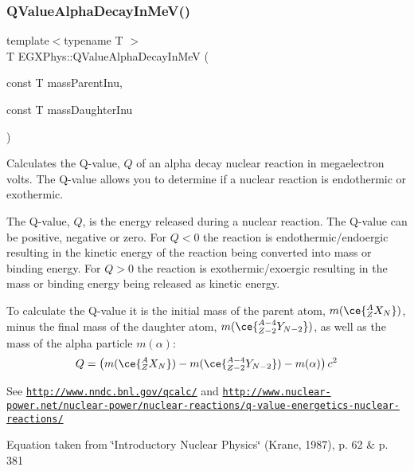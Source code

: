 \subsubsection{\texorpdfstring{Q\+Value\+Alpha\+Decay\+In\+Me\+V()}{QValueAlphaDecayInMeV()}}
{\footnotesize\ttfamily template$<$typename T $>$ \\
T E\+G\+X\+Phys\+::\+Q\+Value\+Alpha\+Decay\+In\+MeV (\begin{DoxyParamCaption}\item[{const T}]{mass\+Parent\+Inu,  }\item[{const T}]{mass\+Daughter\+Inu }\end{DoxyParamCaption})}



Calculates the Q-\/value, $Q$ of an alpha decay nuclear reaction in megaelectron volts. The Q-\/value allows you to determine if a nuclear reaction is endothermic or exothermic. 

The Q-\/value, $Q$, is the energy released during a nuclear reaction. The Q-\/value can be positive, negative or zero. For $Q < 0$ the reaction is endothermic/endoergic resulting in the kinetic energy of the reaction being converted into mass or binding energy. For $Q > 0$ the reaction is exothermic/exoergic resulting in the mass or binding energy being released as kinetic energy.

To calculate the Q-\/value it is the initial mass of the parent atom, $m(\ce{ ^{A}_{Z}X_{N} })$, minus the final mass of the daughter atom, $m(\ce{ ^{A-4}_{Z-2}Y_{N-2} })$, as well as the mass of the alpha particle $m(\alpha)$\+: \[Q = \left ( m(\ce{ ^{A}_{Z}X_{N} })-m(\ce{ ^{A-4}_{Z-2}Y_{N-2} })-m(\alpha) \right) c^2\]

See \href{http://www.nndc.bnl.gov/qcalc/}{\tt http\+://www.\+nndc.\+bnl.\+gov/qcalc/} and \href{http://www.nuclear-power.net/nuclear-power/nuclear-reactions/q-value-energetics-nuclear-reactions/}{\tt http\+://www.\+nuclear-\/power.\+net/nuclear-\/power/nuclear-\/reactions/q-\/value-\/energetics-\/nuclear-\/reactions/}

Equation taken from \char`\"{}\+Introductory Nuclear Physics\char`\"{} (Krane, 1987), p. 62 \& p. 381


